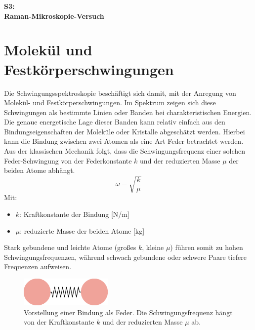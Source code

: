 
\begin{center}
    \begin{huge}
    \textbf{S3:\\}
    \vspace{0.5cm}
    \textbf{Raman-Mikroskopie-Versuch}
    \end{huge}
    \vspace{0.5cm}
\end{center}
\section{Molekül und Festkörperschwingungen}\label{sec:vib}
Die Schwingungsspektroskopie beschäftigt sich damit, mit der Anregung von Molekül- und Festkörperschwingungen. 
Im Spektrum zeigen sich diese Schwingungen als bestimmte Linien oder Banden bei charakteristischen Energien. 
Die genaue energetische Lage dieser Banden kann relativ einfach aus den Bindungseigenschaften der Moleküle oder Kristalle abgeschätzt werden.
Hierbei kann die Bindung zwischen zwei Atomen als eine Art Feder betrachtet werden. Aus der klassischen Mechanik folgt, dass die 
Schwingungsfrequenz einer solchen Feder-Schwingung von der Federkonstante $k$ und der reduzierten Masse $\mu$ der beiden Atome abhängt.
\begin{equation}
    \omega = \sqrt{\frac{k}{\mu}} 
    \label{eq:schwingungsfrequenz}
\end{equation}
Mit:
\begin{itemize}
    \item $k$: Kraftkonstante der Bindung [N/m]
    \item $\mu$: reduzierte Masse der beiden Atome [kg]
\end{itemize}

Stark gebundene und leichte Atome (großes $k$, kleine $\mu$) führen somit zu hohen Schwingungsfrequenzen, während schwach gebundene oder schwere Paare tiefere Frequenzen aufweisen. 

\begin{figure}[H]
    \centering
    \includegraphics[width=0.4\textwidth]{1_Skript/Inkscape/Feder.png}
    \caption{Vorstellung einer Bindung als Feder. Die Schwingungsfrequenz hängt von der Kraftkonstante $k$ und der reduzierten Masse $\mu$ ab.}
    \label{fig:Feder}
\end{figure}

